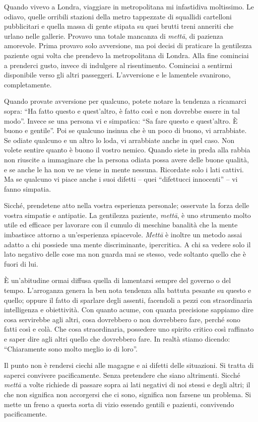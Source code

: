 Quando vivevo a Londra, viaggiare in metropolitana mi infastidiva
moltissimo. Le odiavo, quelle orribili stazioni della metro tappezzate
di squallidi cartelloni pubblicitari e quella massa di gente stipata su
quei brutti treni anneriti che urlano nelle gallerie. Provavo una totale
mancanza di \textit{mettā}, di pazienza amorevole. Prima provavo solo avversione,
ma poi decisi di praticare la gentilezza paziente ogni volta che
prendevo la metropolitana di Londra. Alla fine cominciai a prenderci
gusto, invece di indulgere al risentimento. Cominciai a sentirmi
disponibile verso gli altri passeggeri. L'avversione e le lamentele
svanirono, completamente.

Quando provate avversione per qualcuno, potete notare la tendenza a
ricamarci sopra: ``Ha fatto questo e quest'altro, è fatto così e non
dovrebbe essere in tal modo''. Invece se una persona vi e simpatica: ``Sa
fare questo e quest'altro. È buono e gentile''. Poi se qualcuno insinua
che è un poco di buono, vi arrabbiate. Se odiate qualcuno e un altro lo
loda, vi arrabbiate anche in quel caso. Non volete sentire quanto è
buono il vostro nemico. Quando siete in preda alla rabbia non riuscite a
immaginare che la persona odiata possa avere delle buone qualità, e se
anche le ha non ve ne viene in mente nessuna. Ricordate solo i lati
cattivi. Ma se qualcuno vi piace anche i suoi difetti – quei ``difettucci
innocenti'' – vi fanno simpatia.

Sicché, prendetene atto nella vostra esperienza personale; osservate la
forza delle vostra simpatie e antipatie. La gentilezza paziente, \textit{mettā},
è uno strumento molto utile ed efficace per lavorare con il cumulo di
meschine banalità che la mente imbastisce attorno a un'esperienza
spiacevole. \textit{Mettā} è inoltre un metodo assai adatto a chi possiede una
mente discriminante, ipercritica. A chi sa vedere solo il lato negativo
delle cose ma non guarda mai se stesso, vede soltanto quello che è fuori
di lui.

È un'abitudine ormai diffusa quella di lamentarsi sempre del governo o
del tempo. L'arroganza genera la ben nota tendenza alla battuta pesante
su questo e quello; oppure il fatto di sparlare degli assenti, facendoli
a pezzi con straordinaria intelligenza e obiettività. Con quanto acume,
con quanta precisione sappiamo dire cosa servirebbe agli altri, cosa
dovrebbero o non dovrebbero fare, perché sono fatti così e colà. Che
cosa straordinaria, possedere uno spirito critico così raffinato e saper
dire agli altri quello che dovrebbero fare. In realtà stiamo dicendo:
``Chiaramente sono molto meglio io di loro''.

Il punto non è rendersi ciechi alle magagne e ai difetti delle
situazioni. Si tratta di saperci convivere pacificamente. Senza
pretendere che siano altrimenti. Sicché \textit{mettā} a volte richiede di
passare sopra ai lati negativi di noi stessi e degli altri; il che non
significa non accorgersi che ci sono, significa non farsene un problema.
Si mette un freno a questa sorta di vizio essendo gentili e pazienti,
convivendo pacificamente.

